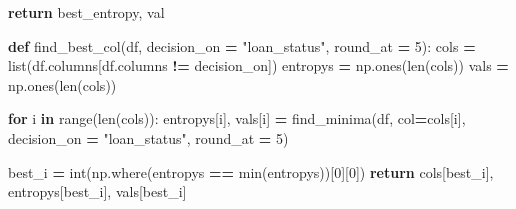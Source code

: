 \documentclass[
]{book}
\newenvironment{Shaded}{\begin{snugshade}}{\end{snugshade}}
\newcommand{\BuiltInTok}[1]{#1}
\newcommand{\ControlFlowTok}[1]{\textcolor[rgb]{0.13,0.29,0.53}{\textbf{#1}}}
\newcommand{\DecValTok}[1]{\textcolor[rgb]{0.00,0.00,0.81}{#1}}
\newcommand{\KeywordTok}[1]{\textcolor[rgb]{0.13,0.29,0.53}{\textbf{#1}}}
\newcommand{\NormalTok}[1]{#1}
\newcommand{\OperatorTok}[1]{\textcolor[rgb]{0.81,0.36,0.00}{\textbf{#1}}}
\newcommand{\StringTok}[1]{\textcolor[rgb]{0.31,0.60,0.02}{#1}}
\begin{document}
\begin{Shaded}
\begin{Highlighting}[]
  \ControlFlowTok{return}\NormalTok{ best\_entropy, val}


\KeywordTok{def}\NormalTok{ find\_best\_col(df, decision\_on }\OperatorTok{=} \StringTok{"loan\_status"}\NormalTok{, round\_at }\OperatorTok{=} \DecValTok{5}\NormalTok{):}
\NormalTok{  cols }\OperatorTok{=} \BuiltInTok{list}\NormalTok{(df.columns[df.columns }\OperatorTok{!=}\NormalTok{ decision\_on])}
\NormalTok{  entropys }\OperatorTok{=}\NormalTok{ np.ones(}\BuiltInTok{len}\NormalTok{(cols))}
\NormalTok{  vals }\OperatorTok{=}\NormalTok{ np.ones(}\BuiltInTok{len}\NormalTok{(cols))}
  
  \ControlFlowTok{for}\NormalTok{ i }\KeywordTok{in} \BuiltInTok{range}\NormalTok{(}\BuiltInTok{len}\NormalTok{(cols)):}
\NormalTok{    entropys[i], vals[i] }\OperatorTok{=}\NormalTok{ find\_minima(df, col}\OperatorTok{=}\NormalTok{cols[i], decision\_on }\OperatorTok{=} \StringTok{"loan\_status"}\NormalTok{, round\_at }\OperatorTok{=} \DecValTok{5}\NormalTok{)}
  
\NormalTok{  best\_i }\OperatorTok{=} \BuiltInTok{int}\NormalTok{(np.where(entropys }\OperatorTok{==} \BuiltInTok{min}\NormalTok{(entropys))[}\DecValTok{0}\NormalTok{][}\DecValTok{0}\NormalTok{])}
  \ControlFlowTok{return}\NormalTok{ cols[best\_i], entropys[best\_i], vals[best\_i]}





\end{Highlighting}
\end{Shaded}
\end{document}
